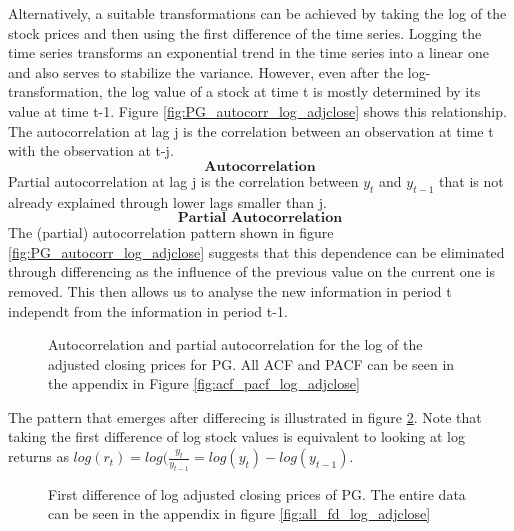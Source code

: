 Alternatively, a suitable transformations can be achieved by taking the log of the stock prices and then using the first difference of the time series. Logging the time series transforms an exponential trend in the time series into a linear one and also serves to stabilize the variance. However, even after the log-transformation, the log value of a stock at time t is mostly determined by its value at time t-1. Figure \ref{fig:PG_autocorr_log_adjclose} shows this relationship. The autocorrelation at lag j is the correlation between an observation at time t with the observation at t-j. 
\begin{equation*}
    \textbf{Autocorrelation}
\end{equation*}{}
Partial autocorrelation at lag j is the correlation between $y_t$ and $y_{t-1}$ that is not already explained through lower lags smaller than j.  
\begin{equation*}
    \textbf{Partial Autocorrelation}
\end{equation*}{}
The (partial) autocorrelation pattern shown in figure \ref{fig:PG_autocorr_log_adjclose} suggests that this dependence can be eliminated through differencing as the influence of the previous value on the current one is removed. This then allows us to analyse the new information in period t independt from the information in period t-1. 
\begin{figure}[h]
    \centering
    \begin{adjustbox}{width=.9\textwidth,center}
    
    \end{adjustbox}  
    \caption{Autocorrelation and partial autocorrelation for the log of the adjusted closing prices for PG. All ACF and PACF can be seen in the appendix in Figure \ref{fig:acf_pacf_log_adjclose}
}
    \label{fig:acf_pacf_log_adjclose_PG}
\end{figure}{}

The pattern that emerges after differecing is illustrated in figure \ref{fig:PG_fd_log_adjclose}. Note that taking the first difference of log stock values is equivalent to looking at log returns as $log(r_t) = log(\frac{y_t}{y_{t-1}} = log(y_t) - log(y_{t-1})$. 

\begin{figure}[H]
    \centering
    \begin{adjustbox}{width=.9\textwidth,center}
    
    \end{adjustbox}  
    \caption{First difference of log adjusted closing prices of PG. The entire data can be seen in the appendix in figure \ref{fig:all_fd_log_adjclose}}
    \label{fig:PG_fd_log_adjclose}
\end{figure}{}


